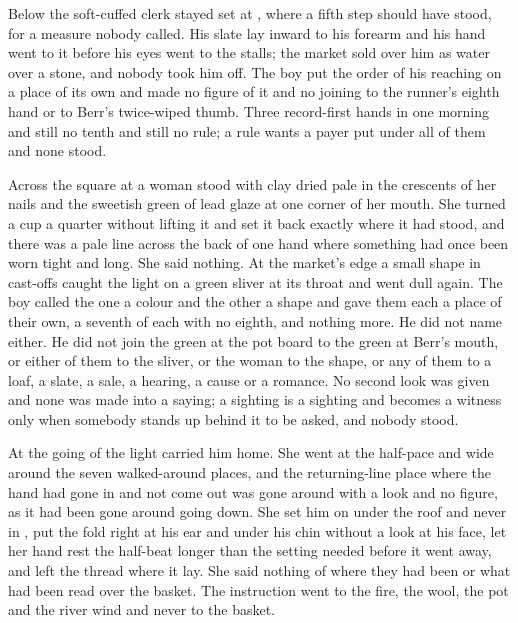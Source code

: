 Below  the soft-cuffed clerk stayed set at , where a fifth step should have stood, for a measure nobody called. His slate lay inward to his forearm and his hand went to it before his eyes went to the stalls; the market sold over him as water over a stone, and nobody took him off. The boy put the order of his reaching on a place of its own and made no figure of it and no joining to the runner's eighth hand or to Berr's twice-wiped thumb. Three record-first hands in one morning and still no tenth and still no rule; a rule wants a payer put under all of them and none stood.

Across the square at  a woman stood with clay dried pale in the crescents of her nails and the sweetish green of lead glaze at one corner of her mouth. She turned a cup a quarter without lifting it and set it back exactly where it had stood, and there was a pale line across the back of one hand where something had once been worn tight and long. She said nothing. At the market's edge a small shape in cast-offs caught the light on a green sliver at its throat and went dull again. The boy called the one a colour and the other a shape and gave them each a place of their own, a seventh of each with no eighth, and nothing more. He did not name either. He did not join the green at the pot board to the green at Berr's mouth, or either of them to the sliver, or the woman to the shape, or any of them to a loaf, a slate, a sale, a hearing, a cause or a romance. No second look was given and none was made into a saying; a sighting is a sighting and becomes a witness only when somebody stands up behind it to be asked, and nobody stood.

\scenebreak

At the going of the light  carried him home. She went at the half-pace and wide around the seven walked-around places, and the returning-line place where the hand had gone in and not come out was gone around with a look and no figure, as it had been gone around going down. She set him on  under the roof and never in , put the fold right at his ear and under his chin without a look at his face, let her hand rest the half-beat longer than the setting needed before it went away, and left the thread where it lay. She said nothing of where they had been or what had been read over the basket. The instruction went to the fire, the wool, the pot and the river wind and never to the basket.

